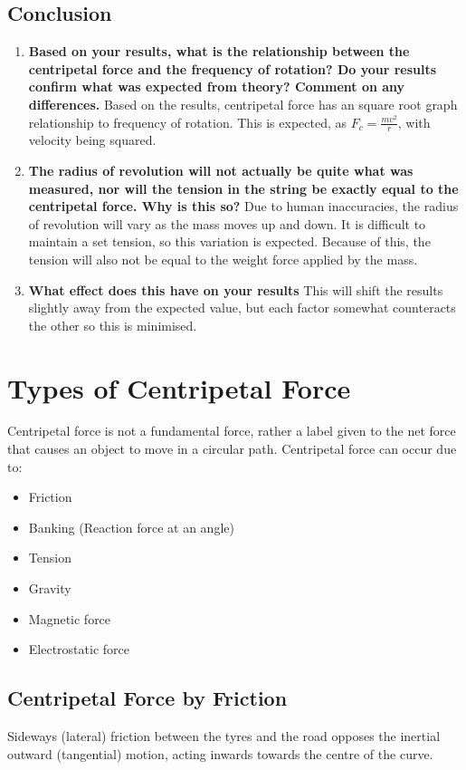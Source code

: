 	\subsection{Conclusion}
		\begin{enumerate}
			\item \textbf{Based on your results, what is the relationship between the centripetal force and the frequency of rotation? Do your results confirm what was expected from theory? Comment on any differences.}
				\subitem Based on the results, centripetal force has an square root graph relationship to frequency of rotation. This is expected, as $F_{c}=\frac{mv^2}{r}$, with velocity being squared.
			\item \textbf{The radius of revolution will not actually be quite what was measured, nor will the tension in the string be exactly equal to the centripetal force. Why is this so?}
				\subitem Due to human inaccuracies, the radius of revolution will vary as the mass moves up and down. It is difficult to maintain a set tension, so this variation is expected. Because of this, the tension will also not be equal to the weight force applied by the mass.
			\item \textbf{What effect does this have on your results}
				\subitem This will shift the results slightly away from the expected value, but each factor somewhat counteracts the other so this is minimised.
		\end{enumerate}

\section{Types of Centripetal Force} \label{11/11/2024}
	Centripetal force is not a fundamental force, rather a label given to the net force that causes an object to move in a circular path. Centripetal force can occur due to:
	\begin{itemize}
		\item Friction
		\item Banking (Reaction force at an angle)
		\item Tension
		\item Gravity
		\item Magnetic force
		\item Electrostatic force
	\end{itemize}

	\subsection{Centripetal Force by Friction}
		Sideways (lateral) friction between the tyres and the road opposes the inertial outward (tangential) motion, acting inwards towards the centre of the curve.

